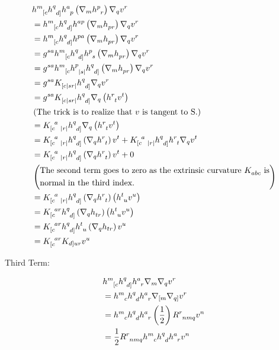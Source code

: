 \begin{align*}
    & \tt{h}{m}{[c} \tt{h}{q}{d]} \tt{h}{a}{p} \lera{ \nabla_m \tt{h}{p}{r}} \nabla_q v^r \\
    &= \tt{h}{m}{[c} \tt{h}{q}{d]} \tt{h}{ap}{} \lera{ \nabla_m \tt{h}{}{pr}} \nabla_q v^r \\
    &= \tt{h}{m}{[c} \tt{h}{q}{d]} \tt{h}{pa}{} \lera{ \nabla_m \tt{h}{}{pr}} \nabla_q v^r \\
    &= \tt{g}{sa}{}\tt{h}{m}{[c} \tt{h}{q}{d]} \tt{h}{p}{s} \lera{ \nabla_m \tt{h}{}{pr}} \nabla_q v^r \\
    &= \tt{g}{sa}{}\tt{h}{m}{[c} \tt{h}{p}{|s|} \tt{h}{q}{d]}  \lera{ \nabla_m \tt{h}{}{pr}} \nabla_q v^r \\
    &= \tt{g}{sa}{} \tt{K}{}{[c|sr|} \tt{h}{q}{d]} \nabla_q v^r \\
    &= \tt{g}{sa}{} \tt{K}{}{[c|sr|} \tt{h}{q}{d]} \nabla_q \lera{ \tt{h}{r}{t} v^t} \\
    & \lera{\text{The trick is to realize that $v$ is tangent to S.}} \\
    &=  K^{\;\;a}_{[c \;\;\; |r|} \tt{h}{q}{d]} \nabla_q \lera{ \tt{h}{r}{t} v^t} \\
    &=  K^{\;\;a}_{[c \;\;\; |r|} \tt{h}{q}{d]} \lera{ \nabla_q \tt{h}{r}{t}} v^t + K^{\;\;a}_{[c \;\;\; |r|} \tt{h}{q}{d]} \tt{h}{r}{t} \nabla_q v^t \\
    &=  K^{\;\;a}_{[c \;\;\; |r|} \tt{h}{q}{d]} \lera{ \nabla_q \tt{h}{r}{t}} v^t +0 \\
    & \lera{
    \begin{aligned}[]
        &\text{The second term goes to zero as the extrinsic curvature $ \tt{K}{}{abc}$ is} \\
        &\text{normal in the third index.}
    \end{aligned}
    }\\
    &= K^{\;\;a}_{[c \;\;\; |r|} \tt{h}{q}{d]} \lera{ \nabla_q \tt{h}{r}{t}} \lera{ \tt{h}{t}{u} v^u} \\
    &= K^{\;\;ar}_{[c} \tt{h}{q}{d]} \lera{ \nabla_q \tt{h}{}{tr}} \lera{ \tt{h}{t}{u} v^u} \\
    &= K^{\;\; ar}_{[c} \tt{h}{q}{d]} \tt{h}{t}{u} \lera{ \nabla_q h_{tr}} v^u \\
    &= K^{\; \; ar}_{[c} K_{d]ur} v^u 
\end{align*}


Third Term:

\begin{align*}
    & \tt{h}{m}{[c} \tt{h}{q}{d]} \tt{h}{a}{r} \nabla_m \nabla_q v^r \\
    &= \tt{h}{m}{c} \tt{h}{q}{d} \tt{h}{a}{r} \nabla_{[m} \nabla_{q]} v^r \\
    &= \tt{h}{m}{c} \tt{h}{q}{d} \tt{h}{a}{r} \left(\frac{1}{2} \right) \tt{R}{r}{nmq} v^n \\
    &= \frac{1}{2} \tt{R}{r}{nmq} \tt{h}{m}{c } \tt{h}{q}{d} \tt{h}{a}{r} v^n 
\end{align*}

